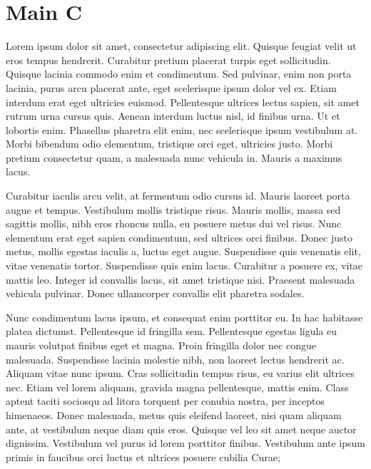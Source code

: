 \section{Main C}
Lorem ipsum dolor sit amet, consectetur adipiscing elit.
Quisque feugiat velit ut eros tempus hendrerit.
Curabitur pretium placerat turpis eget sollicitudin.
Quisque lacinia commodo enim et condimentum.
Sed pulvinar, enim non porta lacinia, purus arcu placerat ante, eget scelerisque ipsum dolor vel ex.
Etiam interdum erat eget ultricies euismod.
Pellentesque ultrices lectus sapien, sit amet rutrum urna cursus quis.
Aenean interdum luctus nisl, id finibus urna.
Ut et lobortis enim.
Phasellus pharetra elit enim, nec scelerisque ipsum vestibulum at.
Morbi bibendum odio elementum, tristique orci eget, ultricies justo.
Morbi pretium consectetur quam, a malesuada nunc vehicula in.
Mauris a maximus lacus.


Curabitur iaculis arcu velit, at fermentum odio cursus id.
Mauris laoreet porta augue et tempus.
Vestibulum mollis tristique risus.
Mauris mollis, massa sed sagittis mollis, nibh eros rhoncus nulla, eu posuere metus dui vel risus.
Nunc elementum erat eget sapien condimentum, sed ultrices orci finibus.
Donec justo metus, mollis egestas iaculis a, luctus eget augue.
Suspendisse quis venenatis elit, vitae venenatis tortor.
Suspendisse quis enim lacus.
Curabitur a posuere ex, vitae mattis leo.
Integer id convallis lacus, sit amet tristique nisi.
Praesent malesuada vehicula pulvinar.
Donec ullamcorper convallis elit pharetra sodales.


Nunc condimentum lacus ipsum, et consequat enim porttitor eu.
In hac habitasse platea dictumst.
Pellentesque id fringilla sem.
Pellentesque egestas ligula eu mauris volutpat finibus eget et magna.
Proin fringilla dolor nec congue malesuada.
Suspendisse lacinia molestie nibh, non laoreet lectus hendrerit ac.
Aliquam vitae nunc ipsum.
Cras sollicitudin tempus risus, eu varius elit ultrices nec.
Etiam vel lorem aliquam, gravida magna pellentesque, mattis enim.
Class aptent taciti sociosqu ad litora torquent per conubia nostra, per inceptos himenaeos.
Donec malesuada, metus quis eleifend laoreet, nisi quam aliquam ante, at vestibulum neque diam quis eros.
Quisque vel leo sit amet neque auctor dignissim.
Vestibulum vel purus id lorem porttitor finibus.
Vestibulum ante ipsum primis in faucibus orci luctus et ultrices posuere cubilia Curae;
 